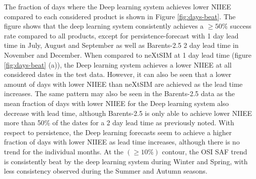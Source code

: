 \documentclass[../main/thesis.tex]{subfiles}
\begin{document}
The fraction of days where the Deep learning system achieves lower NIIEE compared to each considered product is shown in Figure \ref{fig:days-beat}. The figure shows that the deep learning system consistently achieves a $\geq50\%$ success rate compared to all products, except for persistence-forecast with 1 day lead time in July, August and September as well as Barents-2.5 2 day lead time in November and December. When compared to neXtSIM at 1 day lead time (figure \ref{fig:days-beat} (a)), the Deep learning system achieves a lower NIIEE at all considered dates in the test data. However, it can also be seen that a lower amount of days with lower NIIEE than neXtSIM are achieved as the lead time increases. The same pattern may also be seen in the Barents-2.5 data as the mean fraction of days with lower NIIEE for the Deep learning system also decrease with lead time, although Barents-2.5 is only able to achieve lower NIIEE more than 50\% of the dates for a 2 day lead time as previously noted. With respect to persistence, the Deep learning forecasts seem to achieve a higher fraction of days with lower NIIEE as lead time increases, although there is no trend for the individual months. At the $(\geq10\%)$ contour, the OSI SAF trend is consistently beat by the deep learning system during Winter and Spring, with less consistency observed during the Summer and Autumn seasons.
\end{document}
